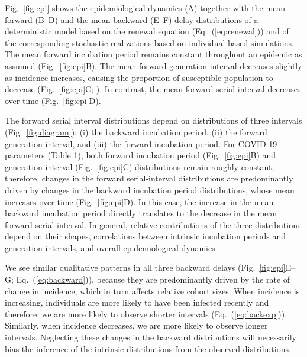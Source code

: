 \documentclass[12pt]{article}
\newcommand{\eref}[1]{Eq.~(\ref{eq:#1})}
\newcommand{\fref}[1]{Fig.~\ref{fig:#1}}
\begin{document}
\fref{epi} shows the epidemiological dynamics (A) together with the mean forward (B--D) and the mean backward (E--F) delay distributions of a deterministic model based on the renewal equation (\eref{renewal}) and of the corresponding stochastic realizations based on individual-based simulations.
The mean forward incubation period remains constant throughout an epidemic as assumed (\fref{epi}B).
The mean forward generation interval decreases slightly as incidence increases, causing the proportion of susceptible population to decrease (\fref{epi}C; \cite{kenah2008generation, champredon2015intrinsic}).
In contrast, the mean forward serial interval decreases over time (\fref{epi}D).

The forward serial interval distributions depend on distributions of three intervals
(\fref{diagram}): (i) the backward incubation period, (ii) the forward generation interval, and (iii) the forward incubation period.
For COVID-19 parameters (Table 1), both forward incubation period (\fref{epi}B) and generation-interval (\fref{epi}C) distributions remain roughly constant;
therefore, changes in the forward serial-interval distributions are predominantly driven by changes in the backward incubation period distributions, whose mean increases over time (\fref{epi}D).
In this case, the increase in the mean backward incubation period directly translates to the decrease in the mean forward serial interval.
In general, relative contributions of the three distributions depend on their shapes, correlations between intrinsic incubation periods and generation intervals, and overall epidemiological dynamics.

We see similar qualitative patterns in all three backward delays (\fref{epi}E--G; \eref{backward}), because they are predominantly driven by the rate of change in incidence, which in turn affects relative cohort sizes.
When incidence is increasing, individuals are more likely to have been infected recently and therefore, we are more likely to observe shorter intervals (\eref{backexp}).
Similarly, when incidence decreases, we are more likely to observe longer intervals.
Neglecting these changes in the backward distributions will necessarily bias the inference of the intrinsic distributions from the observed distributions.
\end{document}
